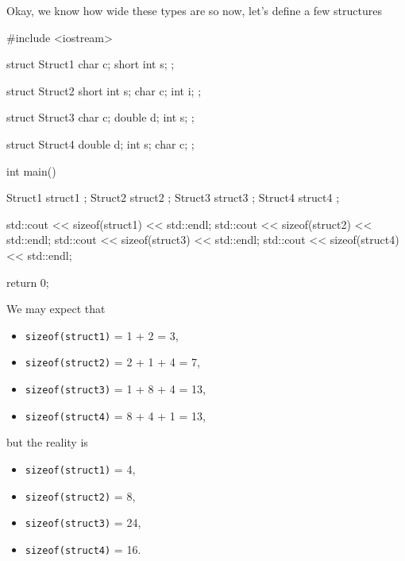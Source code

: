 \documentclass[../main]{subfiles}
\begin{document}
    Okay, we know how wide these types are so now, let's define a few structures
\begin{Code}
    #include <iostream>
    
    struct Struct1
    { 
        char c; 
        short int s; 
    }; 
      
    struct Struct2
    { 
        short int s; 
        char c; 
        int i; 
    }; 
      
    struct Struct3
    { 
        char c; 
        double d; 
        int s; 
    }; 
      
    struct Struct4
    { 
        double d; 
        int s; 
        char c; 
    };
    
    int main()
    {
        Struct1 struct1 {};
        Struct2 struct2 {};
        Struct3 struct3 {};
        Struct4 struct4 {};
        
        std::cout << sizeof(struct1) << std::endl;
        std::cout << sizeof(struct2) << std::endl;
        std::cout << sizeof(struct3) << std::endl;
        std::cout << sizeof(struct4) << std::endl;
        
        return 0;
    }
\end{Code}
\noindent
We may expect that
\begin{itemize}
    \item \texttt{sizeof(struct1)} = 1 + 2 = 3,
    \item \texttt{sizeof(struct2)} = 2 + 1 + 4 = 7,
    \item \texttt{sizeof(struct3)} = 1 + 8 + 4 = 13,
    \item \texttt{sizeof(struct4)} = 8 + 4 + 1 = 13,
\end{itemize}
\noindent
but the reality is
\begin{itemize}
    \item \texttt{sizeof(struct1)} = 4, 
    \item \texttt{sizeof(struct2)} = 8,
    \item \texttt{sizeof(struct3)} = 24,
    \item \texttt{sizeof(struct4)} = 16.
\end{itemize}
\end{document}
